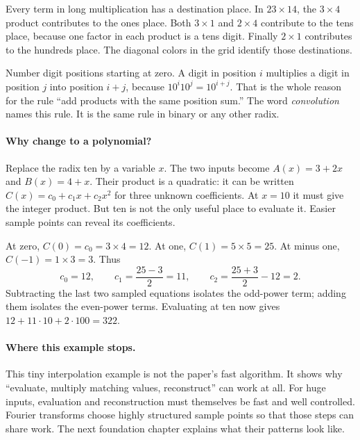 
Every term in long multiplication has a destination place. In $23\times14$,
the $3\times4$ product contributes to the ones place. Both $3\times1$
and $2\times4$ contribute to the tens place, because one factor in each
product is a tens digit. Finally $2\times1$ contributes to the hundreds
place. The diagonal colors in the grid identify those destinations.


Number digit positions starting at zero. A digit in position $i$ multiplies
a digit in position $j$ into position $i+j$, because $10^i10^j=10^{i+j}$.
That is the whole reason for the rule ``add products with the same position
sum.'' The word \emph{convolution} names this rule. It is the same rule in
binary or any other radix.

\paragraph{Why change to a polynomial?}
Replace the radix ten by a variable $x$. The two inputs become
$A(x)=3+2x$ and $B(x)=4+x$. Their product is a quadratic: it can be
written $C(x)=c_0+c_1x+c_2x^2$ for three unknown coefficients.
At $x=10$ it must give the integer product. But ten is not the only useful
place to evaluate it. Easier sample points can reveal its coefficients.


At zero, $C(0)=c_0=3\times4=12$. At one, $C(1)=5\times5=25$.
At minus one, $C(-1)=1\times3=3$. Thus
\[
 c_0=12,\qquad
 c_1=\frac{25-3}{2}=11,\qquad
 c_2=\frac{25+3}{2}-12=2.
\]
Subtracting the last two sampled equations isolates the odd-power term;
adding them isolates the even-power terms. Evaluating at ten now gives
$12+11\cdot10+2\cdot100=322$.

\paragraph{Where this example stops.}
This tiny interpolation example is not the paper's fast algorithm. It shows
why ``evaluate, multiply matching values, reconstruct'' can work at all.
For huge inputs, evaluation and reconstruction must themselves be fast and
well controlled. Fourier transforms choose highly structured sample points
so that those steps can share work. The next foundation chapter explains
what their patterns look like.

